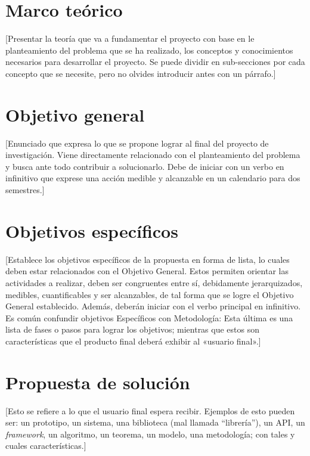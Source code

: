 \documentclass[final,12pt]{article}
\begin{document}
\section{Marco teórico}

[Presentar la teoría que va a fundamentar el proyecto con base en le planteamiento del problema que se ha realizado, los conceptos y conocimientos necesarios para desarrollar el proyecto. Se puede dividir en sub-secciones por cada concepto que se necesite, pero no olvides introducir antes con un párrafo.]

\section{Objetivo general}

[Enunciado que expresa lo que se propone lograr al final del proyecto de investigación. 
Viene directamente relacionado con el planteamiento del problema y busca ante todo contribuir a solucionarlo. 
Debe de iniciar con un verbo en infinitivo que exprese una acción medible y alcanzable en un calendario para dos semestres.]


\section{Objetivos específicos}
[Establece los objetivos específicos de la propuesta en forma de lista, lo cuales deben estar relacionados con el Objetivo General. Estos permiten orientar las actividades a realizar, deben ser congruentes entre sí, debidamente jerarquizados, medibles, cuantificables y ser alcanzables, de tal forma que se logre el Objetivo General establecido. Además, deberán iniciar con el verbo principal en infinitivo.
Es común confundir objetivos Específicos con Metodología: Esta última es una lista de fases o pasos para lograr los objetivos; mientras que estos son características que el producto final deberá exhibir al «usuario final».]

\section{Propuesta de solución}

[Esto se refiere a lo que el usuario final espera recibir.
Ejemplos de esto pueden ser: un prototipo, un sistema, una biblioteca  (mal llamada ``librería''), un API, un \textit{framework}, un algoritmo, un teorema, un modelo, una metodología; con tales y cuales características.]
\end{document}
